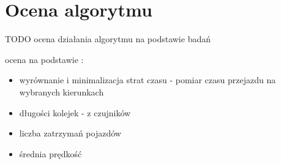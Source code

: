 \chapter{Ocena algorytmu}
\label{chap:ocena}
TODO ocena działania algorytmu na podstawie badań

ocena na podstawie \cite{kawalec+sobieszuk-durka}:
\begin{itemize}
\item wyrównanie i minimalizacja strat czasu - pomiar czasu przejazdu na wybranych kierunkach
\item długości kolejek - z czujników
\item liczba zatrzymań pojazdów
\item średnia prędkość
\end{itemize}